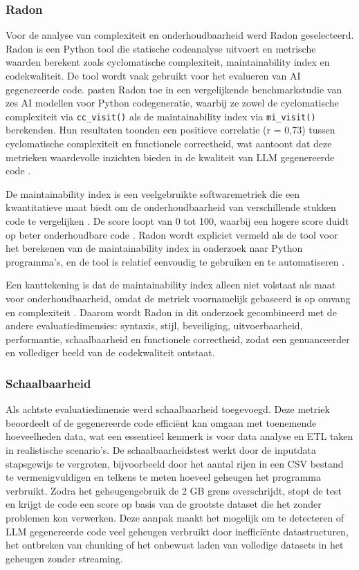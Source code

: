\subsubsection{Radon}
Voor de analyse van complexiteit en onderhoudbaarheid werd Radon geselecteerd. Radon is een Python tool die statische codeanalyse uitvoert en metrische waarden berekent zoals cyclomatische complexiteit, maintainability index en codekwaliteit. De tool wordt vaak gebruikt voor het evalueren van AI gegenereerde code. \textcite{Bayram2025} pasten Radon toe in een vergelijkende benchmarkstudie van zes AI modellen voor Python codegeneratie, waarbij ze zowel de cyclomatische complexiteit via \texttt{cc\_visit()} als de maintainability index via \texttt{mi\_visit()} berekenden. Hun resultaten toonden een positieve correlatie (r = 0,73) tussen cyclomatische complexiteit en functionele correctheid, wat aantoont dat deze metrieken waardevolle inzichten bieden in de kwaliteit van LLM gegenereerde code \autocite{Bayram2025}.

De maintainability index is een veelgebruikte softwaremetriek die een kwantitatieve maat biedt om de onderhoudbaarheid van verschillende stukken code te vergelijken \autocite{Morrison2023}. De score loopt van 0 tot 100, waarbij een hogere score duidt op beter onderhoudbare code \autocite{Morrison2023}. Radon wordt expliciet vermeld als de tool voor het berekenen van de maintainability index in onderzoek naar Python programma's, en de tool is relatief eenvoudig te gebruiken en te automatiseren \autocite{Morrison2023}.

Een kanttekening is dat de maintainability index alleen niet volstaat als maat voor onderhoudbaarheid, omdat de metriek voornamelijk gebaseerd is op omvang en complexiteit \autocite{Morrison2023}. Daarom wordt Radon in dit onderzoek gecombineerd met de andere evaluatiedimensies: syntaxis, stijl, beveiliging, uitvoerbaarheid, performantie, schaalbaarheid en functionele correctheid, zodat een genuanceerder en vollediger beeld van de codekwaliteit ontstaat.

\subsubsection{Schaalbaarheid}
Als achtste evaluatiedimensie werd schaalbaarheid toegevoegd. Deze metriek beoordeelt of de gegenereerde code efficiënt kan omgaan met toenemende hoeveelheden data, wat een essentieel kenmerk is voor data analyse en ETL taken in realistische scenario's. De schaalbaarheidstest werkt door de inputdata stapsgewijs te vergroten, bijvoorbeeld door het aantal rijen in een CSV bestand te vermenigvuldigen en telkens te meten hoeveel geheugen het programma verbruikt. Zodra het geheugengebruik de 2 GB grens overschrijdt, stopt de test en krijgt de code een score op basis van de grootste dataset die het zonder problemen kon verwerken. Deze aanpak maakt het mogelijk om te detecteren of LLM gegenereerde code veel geheugen verbruikt door inefficiënte datastructuren, het ontbreken van chunking of het onbewust laden van volledige datasets in het geheugen zonder streaming.

